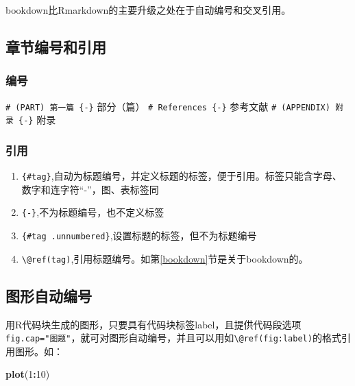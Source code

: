 \documentclass[]{article}
\newenvironment{Shaded}{\begin{snugshade}}{\end{snugshade}}
\newcommand{\DecValTok}[1]{\textcolor[rgb]{0.00,0.00,0.81}{#1}}
\newcommand{\KeywordTok}[1]{\textcolor[rgb]{0.13,0.29,0.53}{\textbf{#1}}}
\newcommand{\NormalTok}[1]{#1}
\newcommand{\OperatorTok}[1]{\textcolor[rgb]{0.81,0.36,0.00}{\textbf{#1}}}
\providecommand{\tightlist}{%
  \setlength{\itemsep}{0pt}\setlength{\parskip}{0pt}}
\begin{document}
bookdown比Rmarkdown的主要升级之处在于自动编号和交叉引用。

\hypertarget{section-25}{%
\subsection{章节编号和引用}\label{section-25}}

\hypertarget{section-26}{%
\subsubsection{编号}\label{section-26}}

\texttt{\#\ (PART)\ 第一篇\ \{-\}} 部分（篇）
\texttt{\#\ References\ \{-\}} 参考文献
\texttt{\#\ (APPENDIX)\ 附录\ \{-\}} 附录

\hypertarget{section-27}{%
\subsubsection{引用}\label{section-27}}

\begin{enumerate}
\def\labelenumi{\arabic{enumi}.}
\tightlist
\item
  \texttt{\{\#tag\}},自动为标题编号，并定义标题的标签，便于引用。标签只能含字母、数字和连字符``-''，图、表标签同
\item
  \texttt{\{-\}},不为标题编号，也不定义标签
\item
  \texttt{\{\#tag\ .unnumbered\}},设置标题的标签，但不为标题编号
\item
  \texttt{\textbackslash{}@ref(tag)},引用标题编号。如第\ref{bookdown}节是关于bookdown的。
\end{enumerate}

\hypertarget{usage-writing-fig}{%
\subsection{图形自动编号}\label{usage-writing-fig}}

用R代码块生成的图形，只要具有代码块标签label，且提供代码段选项\texttt{fig.cap="图题"}，就可对图形自动编号，并且可以用如\texttt{\textbackslash{}@ref(fig:label)}的格式引用图形。如：

\begin{Shaded}
\begin{Highlighting}[]
\KeywordTok{plot}\NormalTok{(}\DecValTok{1}\OperatorTok{:}\DecValTok{10}\NormalTok{)}
\end{Highlighting}
\end{Shaded}
\end{document}
